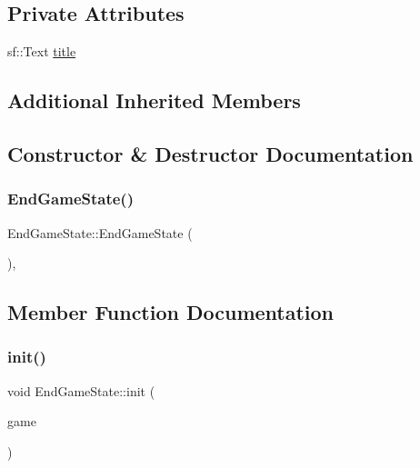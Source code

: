\subsection*{Private Attributes}
\begin{DoxyCompactItemize}
\item 
sf\+::\+Text \mbox{\hyperlink{class_end_game_state_a987fea680922932c1ae2de74d859649d}{title}}
\end{DoxyCompactItemize}
\subsection*{Additional Inherited Members}


\subsection{Constructor \& Destructor Documentation}
\mbox{\label{class_end_game_state_ae8a250f57fa5e2498782d6e78b095d00}} 
\subsubsection{\texorpdfstring{EndGameState()}{EndGameState()}}
{\footnotesize\ttfamily End\+Game\+State\+::\+End\+Game\+State (\begin{DoxyParamCaption}{ }\end{DoxyParamCaption})\hspace{0.3cm}{\ttfamily [inline]}, {\ttfamily [protected]}}



\subsection{Member Function Documentation}
\mbox{\label{class_end_game_state_ac3abeb54305351ce65b66d519ca3e0c1}} 
\subsubsection{\texorpdfstring{init()}{init()}}
{\footnotesize\ttfamily void End\+Game\+State\+::init (\begin{DoxyParamCaption}\item[{\mbox{\hyperlink{class_game_engine}{Game\+Engine}} $\ast$}]{game }\end{DoxyParamCaption})\hspace{0.3cm}{\ttfamily [virtual]}}



